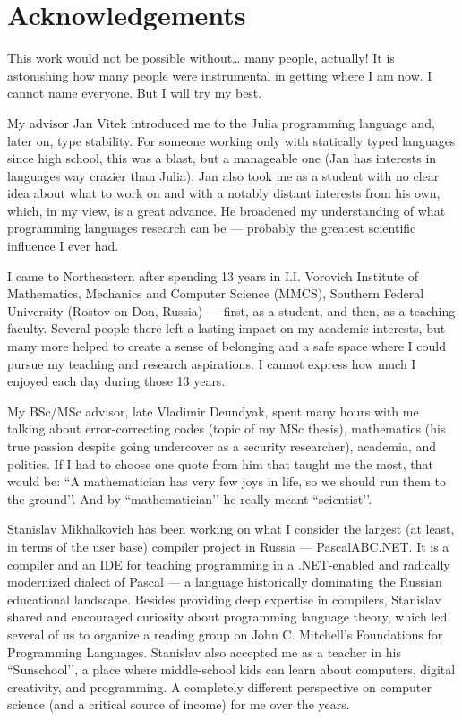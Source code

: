 \cleardoublepage%
%
\chapter*{Acknowledgements}

This work would not be possible without… many people, actually! It is astonishing how many people were instrumental in getting where I am now. I cannot name everyone. But I will try my best.

My advisor Jan Vitek introduced me to the Julia programming language and, later on, type stability. For someone working only with statically typed languages since high school, this was a blast, but a manageable one (Jan has interests in languages way crazier than Julia). Jan also took me as a student with no clear idea about what to work on and with a notably distant interests from his own, which, in my view, is a great advance. He broadened my understanding of what programming languages research can be — probably the greatest scientific influence I ever had.

I came to Northeastern after spending 13 years in I.I. Vorovich Institute of Mathematics, Mechanics and Computer Science (MMCS), Southern Federal University (Rostov-on-Don, Russia) — first, as a student, and then, as a teaching faculty. Several people there left a lasting impact on my academic interests, but many more helped to create a sense of belonging and a safe space where I could pursue my teaching and research aspirations. I cannot express how much I enjoyed each day during those 13 years.

My BSc/MSc advisor, late Vladimir Deundyak, spent many hours with me talking about error-correcting codes (topic of my MSc thesis), mathematics (his true passion despite going undercover as a security researcher), academia, and politics. If I had to choose one quote from him that taught me the most, that would be: ``A mathematician has very few joys in life, so we should run them to the ground’’. And by ``mathematician’’ he really meant ``scientist’’.

Stanislav Mikhalkovich has been working on what I consider the largest (at least, in terms of the user base) compiler project in Russia — PascalABC.NET. It is a compiler and an IDE for teaching programming in a .NET-enabled and radically modernized dialect of Pascal — a language historically dominating the Russian educational landscape. Besides providing deep expertise in compilers, Stanislav shared and encouraged curiosity about programming language theory, which led several of us to organize a reading group on John C. Mitchell’s Foundations for Programming Languages. Stanislav also accepted me as a teacher in his ``Sunschool’’, a place where middle-school kids can learn about computers, digital creativity, and programming. A completely different perspective on computer science (and a critical source of income) for me over the years.


